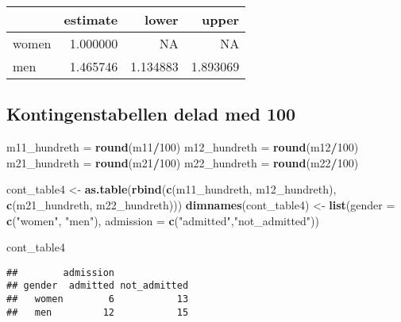 \documentclass[]{article}
\newenvironment{Shaded}{\begin{snugshade}}{\end{snugshade}}
\newcommand{\DataTypeTok}[1]{\textcolor[rgb]{0.13,0.29,0.53}{#1}}
\newcommand{\DecValTok}[1]{\textcolor[rgb]{0.00,0.00,0.81}{#1}}
\newcommand{\KeywordTok}[1]{\textcolor[rgb]{0.13,0.29,0.53}{\textbf{#1}}}
\newcommand{\NormalTok}[1]{#1}
\newcommand{\OperatorTok}[1]{\textcolor[rgb]{0.81,0.36,0.00}{\textbf{#1}}}
\newcommand{\StringTok}[1]{\textcolor[rgb]{0.31,0.60,0.02}{#1}}
\begin{document}
\begin{longtable}[]{@{}lrrr@{}}
\toprule
& estimate & lower & upper\tabularnewline
\midrule
\endhead
women & 1.000000 & NA & NA\tabularnewline
men & 1.465746 & 1.134883 & 1.893069\tabularnewline
\bottomrule
\end{longtable}

\hypertarget{kontingenstabellen-delad-med-100}{%
\subsection{Kontingenstabellen delad med
100}\label{kontingenstabellen-delad-med-100}}

\begin{Shaded}
\begin{Highlighting}[]
\NormalTok{m11_hundreth =}\StringTok{ }\KeywordTok{round}\NormalTok{(m11}\OperatorTok{/}\DecValTok{100}\NormalTok{)}
\NormalTok{m12_hundreth =}\StringTok{ }\KeywordTok{round}\NormalTok{(m12}\OperatorTok{/}\DecValTok{100}\NormalTok{)}
\NormalTok{m21_hundreth =}\StringTok{ }\KeywordTok{round}\NormalTok{(m21}\OperatorTok{/}\DecValTok{100}\NormalTok{)}
\NormalTok{m22_hundreth =}\StringTok{ }\KeywordTok{round}\NormalTok{(m22}\OperatorTok{/}\DecValTok{100}\NormalTok{)}

\NormalTok{cont_table4 <-}\StringTok{ }\KeywordTok{as.table}\NormalTok{(}\KeywordTok{rbind}\NormalTok{(}\KeywordTok{c}\NormalTok{(m11_hundreth, m12_hundreth), }\KeywordTok{c}\NormalTok{(m21_hundreth, m22_hundreth)))}
\KeywordTok{dimnames}\NormalTok{(cont_table4) <-}\StringTok{ }\KeywordTok{list}\NormalTok{(}\DataTypeTok{gender =} \KeywordTok{c}\NormalTok{(}\StringTok{"women"}\NormalTok{, }\StringTok{"men"}\NormalTok{), }\DataTypeTok{admission =} \KeywordTok{c}\NormalTok{(}\StringTok{"admitted"}\NormalTok{,}\StringTok{"not_admitted"}\NormalTok{))}


\NormalTok{cont_table4}
\end{Highlighting}
\end{Shaded}

\begin{verbatim}
##        admission
## gender  admitted not_admitted
##   women        6           13
##   men         12           15
\end{verbatim}
\end{document}
